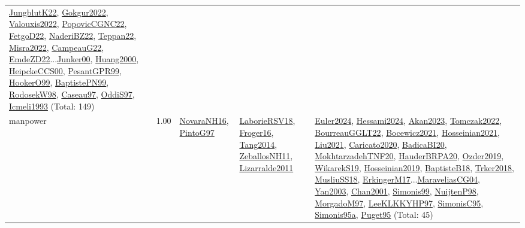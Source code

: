 {\begin{longtable}{p{3cm}r>{\raggedright\arraybackslash}p{6cm}>{\raggedright\arraybackslash}p{6cm}>{\raggedright\arraybackslash}p{8cm}}
\hyperref[detail:JungblutK22]{JungblutK22}, \hyperref[detail:Gokgur2022]{Gokgur2022}, \hyperref[detail:Valouxis2022]{Valouxis2022}, \hyperref[detail:PopovicCGNC22]{PopovicCGNC22}, \hyperref[detail:FetgoD22]{FetgoD22}, \hyperref[detail:NaderiBZ22]{NaderiBZ22}, \hyperref[detail:Teppan22]{Teppan22}, \hyperref[detail:Misra2022]{Misra2022}, \hyperref[detail:CampeauG22]{CampeauG22}, \hyperref[detail:EmdeZD22]{EmdeZD22}...\hyperref[detail:Junker00]{Junker00}, \hyperref[detail:Huang2000]{Huang2000}, \hyperref[detail:HeipckeCCS00]{HeipckeCCS00}, \hyperref[detail:PesantGPR99]{PesantGPR99}, \hyperref[detail:HookerO99]{HookerO99}, \hyperref[detail:BaptistePN99]{BaptistePN99}, \hyperref[detail:RodosekW98]{RodosekW98}, \hyperref[detail:Caseau97]{Caseau97}, \hyperref[detail:OddiS97]{OddiS97}, \hyperref[detail:Icmeli1993]{Icmeli1993} (Total: 149)\\
\index{manpower}\index{Concepts!manpower}manpower &  1.00 & \hyperref[detail:NovaraNH16]{NovaraNH16}, \hyperref[detail:PintoG97]{PintoG97} & \hyperref[detail:LaborieRSV18]{LaborieRSV18}, \hyperref[detail:Froger16]{Froger16}, \hyperref[detail:Tang2014]{Tang2014}, \hyperref[detail:ZeballosNH11]{ZeballosNH11}, \hyperref[detail:Lizarralde2011]{Lizarralde2011} & \hyperref[detail:Euler2024]{Euler2024}, \hyperref[detail:Hessami2024]{Hessami2024}, \hyperref[detail:Akan2023]{Akan2023}, \hyperref[detail:Tomczak2022]{Tomczak2022}, \hyperref[detail:BourreauGGLT22]{BourreauGGLT22}, \hyperref[detail:Bocewicz2021]{Bocewicz2021}, \hyperref[detail:Hosseinian2021]{Hosseinian2021}, \hyperref[detail:Liu2021]{Liu2021}, \hyperref[detail:Caricato2020]{Caricato2020}, \hyperref[detail:BadicaBI20]{BadicaBI20}, \hyperref[detail:MokhtarzadehTNF20]{MokhtarzadehTNF20}, \hyperref[detail:HauderBRPA20]{HauderBRPA20}, \hyperref[detail:Ozder2019]{Ozder2019}, \hyperref[detail:WikarekS19]{WikarekS19}, \hyperref[detail:Hosseinian2019]{Hosseinian2019}, \hyperref[detail:BaptisteB18]{BaptisteB18}, \hyperref[detail:Trker2018]{Trker2018}, \hyperref[detail:MusliuSS18]{MusliuSS18}, \hyperref[detail:ErkingerM17]{ErkingerM17}...\hyperref[detail:MaraveliasCG04]{MaraveliasCG04}, \hyperref[detail:Yan2003]{Yan2003}, \hyperref[detail:Chan2001]{Chan2001}, \hyperref[detail:Simonis99]{Simonis99}, \hyperref[detail:NuijtenP98]{NuijtenP98}, \hyperref[detail:MorgadoM97]{MorgadoM97}, \hyperref[detail:LeeKLKKYHP97]{LeeKLKKYHP97}, \hyperref[detail:SimonisC95]{SimonisC95}, \hyperref[detail:Simonis95a]{Simonis95a}, \hyperref[detail:Puget95]{Puget95} (Total: 45)\\

\end{longtable}}
